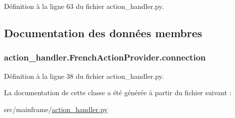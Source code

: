 Définition à la ligne 63 du fichier action\+\_\+handler.\+py.



\subsection{Documentation des données membres}
\hypertarget{classaction__handler_1_1_french_action_provider_a17dc00d7d0e2f5f63963a0156ccca8c7}{}
\subsubsection[{connection}]{\setlength{\rightskip}{0pt plus 5cm}action\+\_\+handler.\+French\+Action\+Provider.\+connection}\label{classaction__handler_1_1_french_action_provider_a17dc00d7d0e2f5f63963a0156ccca8c7}


Définition à la ligne 38 du fichier action\+\_\+handler.\+py.



La documentation de cette classe a été générée à partir du fichier suivant \+:\begin{DoxyCompactItemize}
\item 
src/mainframe/\hyperlink{action__handler_8py}{action\+\_\+handler.\+py}\end{DoxyCompactItemize}
